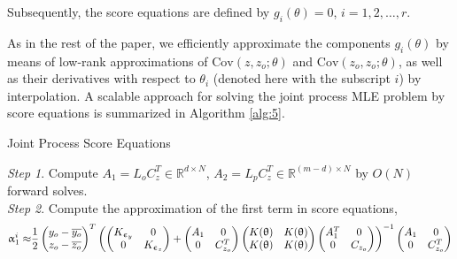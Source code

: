 \documentclass[article,ij4uq]{ij4uq}              %
\begin{document}
Subsequently, the score equations are defined by $g_i(\theta)=0$, $i=1,2,\ldots,r$.

As in the rest of the paper, we efficiently approximate the components $g_i(\theta)$ by means of low-rank approximations of $\mathrm{Cov}(z,z_{o};\theta)$ and $\mathrm{Cov}(z_{o},z_{o};\theta)$, as well as their derivatives with respect to $\theta_i$ (denoted here with the subscript $i$) by interpolation. A scalable approach for solving the joint process MLE problem by score equations is summarized in Algorithm \ref{alg:5}.


\begin{algorithm}[!ht]
\caption{Joint Process Score Equations}\label{alg:5}
\textit{Step 1}. Compute $A_{1}=L_{o}C_{z}^{T}\in\mathbb{R}^{d\times N}$, $A_{2}=L_{p}C_{z}^{T}\in\mathbb{R}^{(m-d)\times N}$ by $O(N)$ forward solves.\\
\textit{Step 2}. Compute the approximation of the first term in score equations,
\begin{align}
    \alpha_{1}^{i}\approx&\frac{1}{2}\begin{pmatrix}y_{o}-\overline{y_{o}}\\ z_{o}-\overline{z_{o}}\end{pmatrix}^{T}\left(\begin{pmatrix}K_{\epsilon_{y}}&0\\0&K_{\epsilon_{z}}\end{pmatrix}+\begin{pmatrix}A_{1}&0\\0&C_{z_{o}}^{T}\end{pmatrix}\begin{pmatrix}K(\theta)&K(\theta)\\K(\theta)&K(\theta)\end{pmatrix}\begin{pmatrix}A_{1}^{T}&0\\0&C_{z_{o}}\end{pmatrix}\right)^{-1}\begin{pmatrix}A_{1} & 0\\0 & C_{z_{o}}^{T}\end{pmatrix}\notag\\

\end{align}
\end{algorithm}
\end{document}

